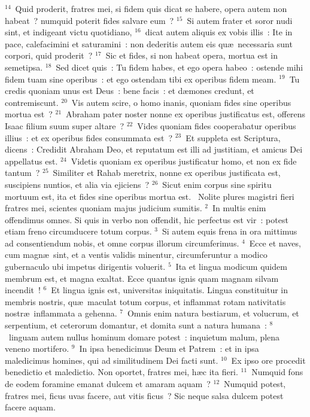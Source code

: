 ${}^{14}$~Quid proderit, fratres mei, si fidem quis dicat se habere, opera autem non habeat~? numquid poterit fides salvare eum~?
${}^{15}$~Si autem frater et soror nudi sint, et indigeant victu quotidiano,
${}^{16}$~dicat autem aliquis ex vobis illis~: Ite in pace, calefacimini et saturamini~: non dederitis autem eis qu\ae\ necessaria sunt corpori, quid proderit~?
${}^{17}$~Sic et fides, si non habeat opera, mortua est in semetipsa.
${}^{18}$~Sed dicet quis~: Tu fidem habes, et ego opera habeo~: ostende mihi fidem tuam sine operibus~: et ego ostendam tibi ex operibus fidem meam.
${}^{19}$~Tu credis quoniam unus est Deus~: bene facis~: et d\ae mones credunt, et contremiscunt.
${}^{20}$~Vis autem scire, o homo inanis, quoniam fides sine operibus mortua est~?
${}^{21}$~Abraham pater noster nonne ex operibus justificatus est, offerens Isaac filium suum super altare~?
${}^{22}$~Vides quoniam fides cooperabatur operibus illius~: et ex operibus fides consummata est~?
${}^{23}$~Et suppleta est Scriptura, dicens~: Credidit Abraham Deo, et reputatum est illi ad justitiam, et amicus Dei appellatus est.
${}^{24}$~Videtis quoniam ex operibus justificatur homo, et non ex fide tantum~?
${}^{25}$~Similiter et Rahab meretrix, nonne ex operibus justificata est, suscipiens nuntios, et alia via ejiciens~?
${}^{26}$~Sicut enim corpus sine spiritu mortuum est, ita et fides sine operibus mortua est.
~\lettrine[lines=10,image=true,loversize=0.05,lraise=-0.03]{N}{}olite plures magistri fieri fratres mei, scientes quoniam majus judicium sumitis.
${}^{2}$~In multis enim offendimus omnes. Si quis in verbo non offendit, hic perfectus est vir~: potest etiam freno circumducere totum corpus.
${}^{3}$~Si autem equis frena in ora mittimus ad consentiendum nobis, et omne corpus illorum circumferimus.
${}^{4}$~Ecce et naves, cum magn\ae\ sint, et a ventis validis minentur, circumferuntur a modico gubernaculo ubi impetus dirigentis voluerit.
${}^{5}$~Ita et lingua modicum quidem membrum est, et magna exaltat. Ecce quantus ignis quam magnam silvam incendit~!
${}^{6}$~Et lingua ignis est, universitas iniquitatis. Lingua constituitur in membris nostris, qu\ae\ maculat totum corpus, et inflammat rotam nativitatis nostr\ae\ inflammata a gehenna.
${}^{7}$~Omnis enim natura bestiarum, et volucrum, et serpentium, et ceterorum domantur, et domita sunt a natura humana~:
${}^{8}$~linguam autem nullus hominum domare potest~: inquietum malum, plena veneno mortifero.
${}^{9}$~In ipsa benedicimus Deum et Patrem~: et in ipsa maledicimus homines, qui ad similitudinem Dei facti sunt.
${}^{10}$~Ex ipso ore procedit benedictio et maledictio. Non oportet, fratres mei, h\ae c ita fieri.
${}^{11}$~Numquid fons de eodem foramine emanat dulcem et amaram aquam~?
${}^{12}$~Numquid potest, fratres mei, ficus uvas facere, aut vitis ficus~? Sic neque salsa dulcem potest facere aquam.


